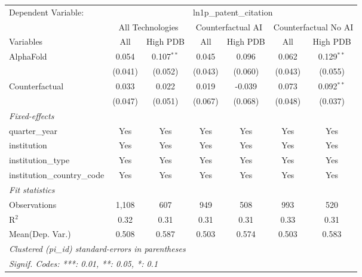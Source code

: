 \begingroup
\centering
\begin{tabular}{lcccccc}
   \tabularnewline \midrule \midrule
   Dependent Variable: & \multicolumn{6}{c}{ln1p\_patent\_citation}\\
 & \multicolumn{2}{c}{All Technologies} & \multicolumn{2}{c}{Counterfactual AI} & \multicolumn{2}{c}{Counterfactual No AI} \\
\cmidrule(lr){1-1}\cmidrule(lr){2-3} \cmidrule(lr){4-5} \cmidrule(lr){6-7}
Variables & \multicolumn{1}{c}{All} & \multicolumn{1}{c}{High PDB} & \multicolumn{1}{c}{All} & \multicolumn{1}{c}{High PDB} & \multicolumn{1}{c}{All} & \multicolumn{1}{c}{High PDB} \\
\cmidrule(lr){1-1}\cmidrule(lr){2-2} \cmidrule(lr){3-3} \cmidrule(lr){4-4} \cmidrule(lr){5-5} \cmidrule(lr){6-6} \cmidrule(lr){7-7}
   AlphaFold                    & 0.054   & 0.107$^{**}$ & 0.045   & 0.096   & 0.062   & 0.129$^{**}$\\   
                                & (0.041) & (0.052)      & (0.043) & (0.060) & (0.043) & (0.055)\\   
   Counterfactual               & 0.033   & 0.022        & 0.019   & -0.039  & 0.073   & 0.092$^{**}$\\   
                                & (0.047) & (0.051)      & (0.067) & (0.068) & (0.048) & (0.037)\\   
   \midrule
   \emph{Fixed-effects}\\
   quarter\_year                & Yes     & Yes          & Yes     & Yes     & Yes     & Yes\\  
   institution                  & Yes     & Yes          & Yes     & Yes     & Yes     & Yes\\  
   institution\_type            & Yes     & Yes          & Yes     & Yes     & Yes     & Yes\\  
   institution\_country\_code   & Yes     & Yes          & Yes     & Yes     & Yes     & Yes\\  
   \midrule
   \emph{Fit statistics}\\
   Observations                 & 1,108   & 607          & 949     & 508     & 993     & 520\\  
   R$^2$                        & 0.32    & 0.31         & 0.31    & 0.31    & 0.33    & 0.31\\  
Mean(Dep. Var.) & 0.508 & 0.587 & 0.503 & 0.574 & 0.503 & 0.583 \\
   \midrule \midrule
   \multicolumn{7}{l}{\emph{Clustered (pi\_id) standard-errors in parentheses}}\\
   \multicolumn{7}{l}{\emph{Signif. Codes: ***: 0.01, **: 0.05, *: 0.1}}\\
\end{tabular}
\par\endgroup
